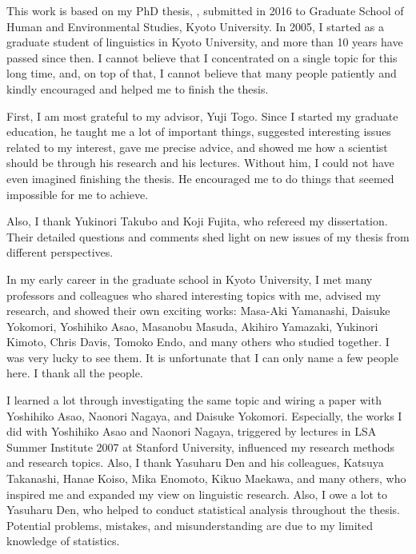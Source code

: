 \begin{refsection}

This work is based on my PhD thesis,
,
submitted in 2016 to Graduate School of Human and Environmental Studies, Kyoto University.
In 2005, I started as a graduate student of linguistics in Kyoto University, and more than 10 years have passed since then.
I cannot believe that I concentrated on a single topic for this long time,
and, on top of that,
I cannot believe that many people patiently and kindly
encouraged and helped me to finish the thesis.

First, I am most grateful to my advisor, Yuji Togo.
Since I started my graduate education,
he taught me a lot of important things,
suggested interesting issues related to my interest,
gave me precise advice, and
showed me how a scientist should be through his research and his lectures.
Without him,
I could not have even imagined finishing the thesis.
He encouraged me to do things that seemed impossible for me to achieve.

Also, I thank Yukinori Takubo and Koji Fujita,
who refereed my dissertation.
Their detailed questions and comments shed light on new issues of my thesis
from different perspectives.

In my early career in the graduate school in Kyoto University,
I met many professors and colleagues who shared interesting topics with me, advised my research, and showed their own exciting works:
Masa-Aki Yamanashi, Daisuke Yokomori, Yoshihiko Asao, Masanobu Masuda, Akihiro Yamazaki, Yukinori Kimoto, Chris Davis, Tomoko Endo, and many others who studied together.
I was very lucky to see them.
It is unfortunate that I can only name a few people here.
I thank all the people.

I learned a lot through investigating the same topic and wiring a paper with Yoshihiko Asao, Naonori Nagaya, and Daisuke Yokomori.
Especially, the works I did with Yoshihiko Asao and Naonori Nagaya,
triggered by lectures in LSA Summer Institute 2007 at Stanford University,
influenced my research methods and research topics.
Also, I thank Yasuharu Den and his colleagues, Katsuya Takanashi, Hanae Koiso, Mika Enomoto, Kikuo Maekawa, and many others,
who inspired me and expanded my view on linguistic research.
Also, I owe a lot to Yasuharu Den, who helped to conduct statistical analysis
throughout the thesis.
Potential problems, mistakes, and misunderstanding are due to my limited knowledge of statistics.


\end{refsection}
